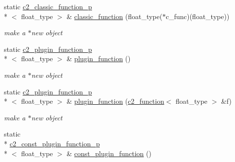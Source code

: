 \begin{DoxyCompactItemize}
\item 
\hypertarget{classc2__factory_ae5c9140b2bfcc6416682562b99479974}{static \hyperlink{classc2__classic__function__p}{c2\-\_\-classic\-\_\-function\-\_\-p}\\*
$<$ float\-\_\-type $>$ \& \hyperlink{classc2__factory_ae5c9140b2bfcc6416682562b99479974}{classic\-\_\-function} (float\-\_\-type($\ast$c\-\_\-func)(float\-\_\-type))}\label{classc2__factory_ae5c9140b2bfcc6416682562b99479974}

\begin{DoxyCompactList}\small\item\em make a $\ast$new object \end{DoxyCompactList}\item 
\hypertarget{classc2__factory_aaea82fa4f0b1f0183314a45923a3b673}{static \hyperlink{classc2__plugin__function__p}{c2\-\_\-plugin\-\_\-function\-\_\-p}\\*
$<$ float\-\_\-type $>$ \& \hyperlink{classc2__factory_aaea82fa4f0b1f0183314a45923a3b673}{plugin\-\_\-function} ()}\label{classc2__factory_aaea82fa4f0b1f0183314a45923a3b673}

\begin{DoxyCompactList}\small\item\em make a $\ast$new object \end{DoxyCompactList}\item 
\hypertarget{classc2__factory_a1481619ba45f2edb065a6cafc3c8d492}{static \hyperlink{classc2__plugin__function__p}{c2\-\_\-plugin\-\_\-function\-\_\-p}\\*
$<$ float\-\_\-type $>$ \& \hyperlink{classc2__factory_a1481619ba45f2edb065a6cafc3c8d492}{plugin\-\_\-function} (\hyperlink{classc2__function}{c2\-\_\-function}$<$ float\-\_\-type $>$ \&f)}\label{classc2__factory_a1481619ba45f2edb065a6cafc3c8d492}

\begin{DoxyCompactList}\small\item\em make a $\ast$new object \end{DoxyCompactList}\item 
\hypertarget{classc2__factory_aebeb20651a347e1fa8f14118faf2588e}{static \\*
\hyperlink{classc2__const__plugin__function__p}{c2\-\_\-const\-\_\-plugin\-\_\-function\-\_\-p}\\*
$<$ float\-\_\-type $>$ \& \hyperlink{classc2__factory_aebeb20651a347e1fa8f14118faf2588e}{const\-\_\-plugin\-\_\-function} ()}\label{classc2__factory_aebeb20651a347e1fa8f14118faf2588e}


\end{DoxyCompactItemize}
